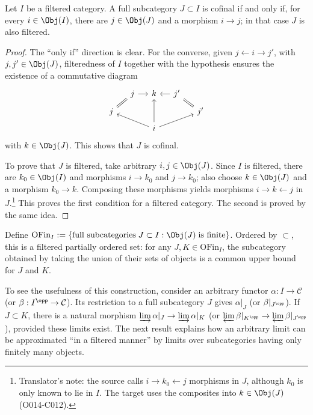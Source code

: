 \begin{proposition}\label{prop:cofinal-filtered}
	Let $I$ be a filtered category. A full subcategory $J\subset I$ is cofinal
	if and only if, for every $i \in \Obj(I)$, there are $j \in \Obj(J)$ and a
	morphism $i \to j$; in that case $J$ is also filtered.
\end{proposition}
\begin{proof}
	The ``only if'' direction is clear. For the converse, given
	$j \leftarrow i \to j'$, with $j, j' \in \Obj(J)$, filteredness of $I$
	together with the hypothesis ensures the existence of a commutative diagram
	\[\begin{tikzcd}[row sep=tiny, column sep=small]
		& j \arrow[r] & k & j' \arrow[l] & \\
		j \arrow[equal, ru] & & & & j' \arrow[equal, lu] \\
		& & i \arrow[llu] \arrow[uu] \arrow[rru] & &
	\end{tikzcd}\]
	with $k \in \Obj(J)$. This shows that $J$ is cofinal.

	To prove that $J$ is filtered, take arbitrary $i, j \in \Obj(J)$. Since
	$I$ is filtered, there are $k_0 \in \Obj(I)$ and morphisms $i\to k_0$ and
	$j\to k_0$; also choose $k \in \Obj(J)$ and a morphism $k_0 \to k$.
	Composing these morphisms yields morphisms $i \rightarrow k \leftarrow j$
	in $J$.\footnote{Translator's note: the source calls
	$i\rightarrow k_0\leftarrow j$ morphisms in $J$, although $k_0$ is only
	known to lie in $I$. The target uses the composites into
	$k\in\Obj(J)$ (O014-C012).} This proves the first condition for a filtered
	category. The second is proved by the same idea.
\end{proof}

\begin{example}
	Define
	$\mathrm{OFin}_I := \left\{ \text{full subcategories}\; J \subset I: \Obj(J) \;\text{is finite} \right\}$.
	Ordered by $\subset$, this is a filtered partially ordered set: for any
	$J, K \in \mathrm{OFin}_I$, the subcategory obtained by taking the union of
	their sets of objects is a common upper bound for $J$ and $K$.
\end{example}

To see the usefulness of this construction, consider an arbitrary functor
$\alpha: I \to \mathcal{C}$ (or $\beta: I^{\opp} \to \mathcal{C}$). Its
restriction to a full subcategory $J$ gives $\alpha|_J$ (or
$\beta|_{J^{\opp}}$). If $J \subset K$, there is a natural morphism
$\varinjlim \alpha|_J \to \varinjlim \alpha|_K$ (or
$\varprojlim \beta|_{K^{\opp}} \to \varprojlim \beta|_{J^{\opp}}$), provided
	these limits exist. The next result explains how an arbitrary limit can be
	approximated ``in a filtered manner'' by limits over subcategories having
	only finitely many objects.

